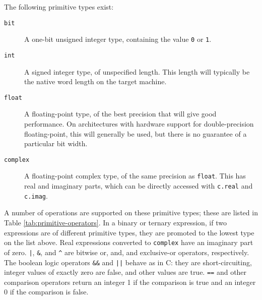\documentclass[11pt]{article}
\begin{document}
The following primitive types exist:

\begin{description}
\item[\texttt{bit}]  A one-bit unsigned integer type, containing
  the value \texttt{0} or \texttt{1}.

\item[\texttt{int}]  A signed integer type, of unspecified length.
  This length will typically be the native word length on the target
  machine.

\item[\texttt{float}]  A floating-point type, of the best precision
  that will give good performance.  On architectures with hardware
  support for double-precision floating-point, this will generally be
  used, but there is no guarantee of a particular bit width.

\item[\texttt{complex}]  A floating-point complex type, of the same
  precision as \texttt{float}.  This has real and imaginary parts,
  which can be directly accessed with \texttt{c.real} and
  \texttt{c.imag}.
\end{description}

\label{sec:operators}
A number of operations are supported on these primitive types; these
are listed in Table \ref{tab:primitive-operators}.  In a binary or
ternary expression, if two expressions are of different primitive
types, they are promoted to the lowest type on the list above.  Real
expressions converted to \texttt{complex} have an imaginary part of
zero.  \texttt{|}, \texttt{\&}, and \texttt{\^} are bitwise or,
and, and exclusive-or operators, respectively.  The boolean logic
operators \texttt{\&\&} and \texttt{||} behave as in C: they are
short-circuiting, integer values of exactly zero are false, and other
values are true.  \texttt{==} and other comparison operators return
an integer 1 if the comparison is true and an integer 0 if the
comparison is false.
\end{document}
